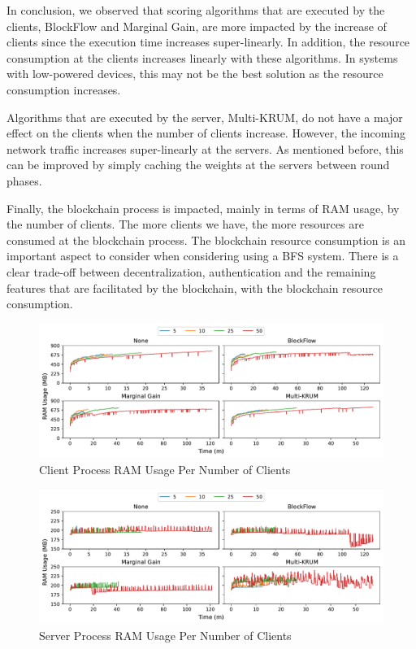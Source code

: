 In conclusion, we observed that scoring algorithms that are executed by the clients, BlockFlow and Marginal Gain, are more impacted by the increase of clients since the execution time increases super-linearly. In addition, the resource consumption at the clients increases linearly with these algorithms. In systems with low-powered devices, this may not be the best solution as the resource consumption increases.

Algorithms that are executed by the server, Multi-KRUM, do not have a major effect on the clients when the number of clients increase. However, the incoming network traffic increases super-linearly at the servers. As mentioned before, this can be improved by simply caching the weights at the servers between round phases.

Finally, the blockchain process is impacted, mainly in terms of RAM usage, by the number of clients. The more clients we have, the more resources are consumed at the blockchain process. The blockchain resource consumption is an important aspect to consider when considering using a BFS system. There is a clear trade-off between decentralization, authentication and the remaining features that are facilitated by the blockchain, with the blockchain resource consumption.

\clearpage

\begin{figure}[!h]
    \centering
    \includegraphics[width=\textwidth]{graphics/clients/ram_client.pdf}
    \caption{Client Process RAM Usage Per Number of Clients}
    \label{fig:ram_clients_clients}
\end{figure}

\vfill

\begin{figure}[!h]
    \centering
    \includegraphics[width=\textwidth]{graphics/clients/ram_server.pdf}
    \caption{Server Process RAM Usage Per Number of Clients}
    \label{fig:ram_clients_servers}
\end{figure}

